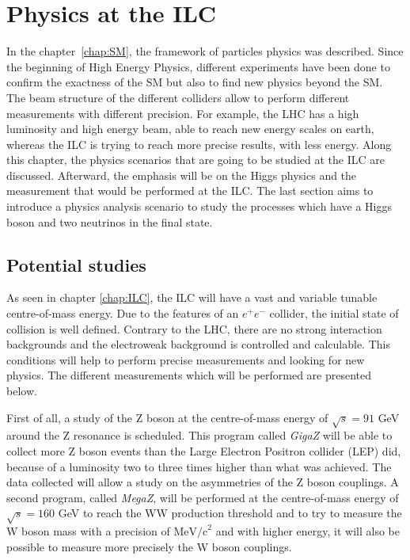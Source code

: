 \chapter{Physics at the ILC}

  In the chapter~\ref{chap:SM}, the framework of particles physics was described. 
  Since the beginning of High Energy Physics, different experiments have been done to confirm the exactness of the SM but also to find new physics beyond the SM. 
  The beam structure of the different colliders allow to perform different measurements with different precision. 
  For example, the LHC has a high luminosity and high energy beam, able to reach new energy scales on earth, whereas the ILC is trying to reach more precise results, with less energy. 
  Along this chapter, the physics scenarios that are going to be studied at the ILC are discussed. 
  Afterward, the emphasis will be on the Higgs physics and the measurement that would be performed at the ILC. 
  The last section aims to introduce a physics analysis scenario to study the processes which have a Higgs boson and two neutrinos in the final state.
 
 \minitoc

  \section{Potential studies}

  As seen in chapter \ref{chap:ILC}, the ILC will have a vast and variable tunable centre-of-mass energy.
  Due to the features of an $e^+e^-$ collider, the initial state of collision is well defined.
  Contrary to the LHC, there are no strong interaction backgrounds and the electroweak background is controlled and calculable.
  This conditions will help to perform precise measurements and looking for new physics. 
  The different measurements which will be performed are presented below.

   First of all, a study of the Z boson at the centre-of-mass energy of $\sqrt{s} = 91$ GeV around the Z resonance is scheduled. 
   This program called \textit{GigaZ} will be able to collect more Z boson events than the Large Electron Positron collider (LEP) did, because of a luminosity two to three times higher than what was achieved. 
   The data collected will allow a study on the asymmetries of the Z boson couplings. 
   A second program, called \textit{MegaZ}, will be performed at the centre-of-mass energy of $\sqrt{s} = 160$ GeV to reach the WW production threshold and to try to measure the W boson mass with a precision of $\text{MeV/c}^2$ and with higher energy, it will also be possible to measure more precisely the W boson couplings.

